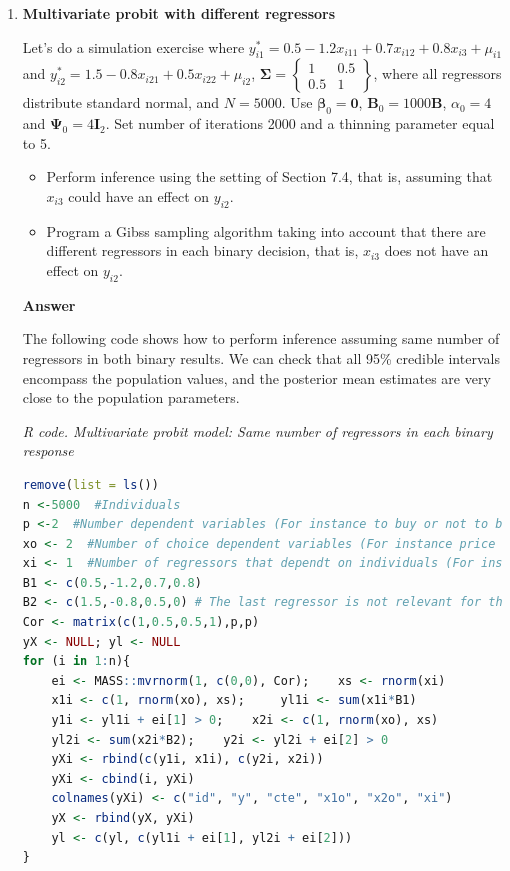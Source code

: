 \begin{enumerate}[leftmargin=*]
\item \textbf{Multivariate probit with different regressors}

Let's do a simulation exercise where $y_{i1}^*=0.5-1.2x_{i11}+0.7x_{i12}+0.8x_{i3}+\mu_{i1}$ and $y_{i2}^*=1.5-0.8x_{i21}+0.5x_{i22}+\mu_{i2}$, $\bm{\Sigma}=\begin{Bmatrix}
	1 & 0.5\\
	0.5 & 1
\end{Bmatrix}$, where all regressors distribute standard normal, and $N=5000$. Use $\bm{\beta}_0=\bm{0}$, $\bm{B}_0=1000\bm{B}$, $\alpha_0=4$ and $\bm{\Psi}_0=4\bm{I}_2$. Set number of iterations 2000 and a thinning parameter equal to 5.  

\begin{itemize}
	\item Perform inference using the setting of Section 7.4, that is, assuming that $x_{i3}$ could have an effect on $y_{i2}$.
	\item Program a Gibss sampling algorithm taking into account that there are different regressors in each binary decision, that is, $x_{i3}$ does not have an effect on $y_{i2}$. 
\end{itemize}  

\textbf{Answer}

The following code shows how to perform inference assuming same number of regressors in both binary results. We can check that all 95\% credible intervals encompass the population values, and the posterior mean estimates are very close to the population parameters. 

\begin{tcolorbox}[enhanced,width=4.67in,center upper,
	fontupper=\large\bfseries,drop shadow southwest,sharp corners]
	\textit{R code. Multivariate probit model: Same number of regressors in each binary response}
	\begin{VF}
		\begin{lstlisting}[language=R]
remove(list = ls())
n <-5000  #Individuals
p <-2  #Number dependent variables (For instance to buy or not to buy different products)
xo <- 2  #Number of choice dependent variables (For instance price of products)
xi <- 1  #Number of regressors that dependt on individuals (For instance income)
B1 <- c(0.5,-1.2,0.7,0.8)
B2 <- c(1.5,-0.8,0.5,0) # The last regressor is not relevant for the second product
Cor <- matrix(c(1,0.5,0.5,1),p,p)
yX <- NULL; yl <- NULL
for (i in 1:n){
	ei <- MASS::mvrnorm(1, c(0,0), Cor); 	xs <- rnorm(xi)
	x1i <- c(1, rnorm(xo), xs); 	yl1i <- sum(x1i*B1)
	y1i <- yl1i + ei[1] > 0; 	x2i <- c(1, rnorm(xo), xs)
	yl2i <- sum(x2i*B2); 	y2i <- yl2i + ei[2] > 0
	yXi <- rbind(c(y1i, x1i), c(y2i, x2i))
	yXi <- cbind(i, yXi)
	colnames(yXi) <- c("id", "y", "cte", "x1o", "x2o", "xi")
	yX <- rbind(yX, yXi)
	yl <- c(yl, c(yl1i + ei[1], yl2i + ei[2])) 
}


\end{lstlisting}
\end{VF}
\end{tcolorbox}
\end{enumerate}
